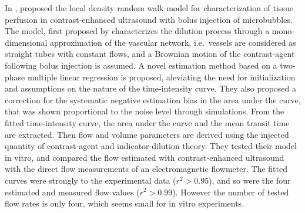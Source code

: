 In \citeyear{Mischi:2003ed}, \citet{Mischi:2003ed} proposed the local density random walk model for characterization of tissue perfusion in contrast-enhanced ultrasound with bolus injection of microbubbles. 
The model, first proposed by \citet{Sheppard:1951we} characterizes the dilution process through a mono-dimensional approximation of the vascular network, i.e.~vessels are considered as straight tubes with constant flows, and a Brownian motion of the contrast-agent following bolus injection is assumed.
A novel estimation method based on a two-phase multiple linear regression is proposed, aleviating the need for initialization and assumptions on the nature of the time-intensity curve.
They also proposed a correction for the systematic negative estimation bias in the area under the curve, that was shown proportional to the noise level through simulations.
From the fitted time-intensity curve, the area under the curve and the mean transit time are extracted.
Then flow and volume parameters are derived using the injected quantity of contrast-agent and indicator-dilution theory.
They tested their model in vitro, and compared the flow estimated with contrast-enhanced ultrasound with the direct flow measurements of an electromagnetic flowmeter.
The fitted curves were strongly to the experimental data ($r^2 \gt 0.95$), and so were the four estimated and measured flow values ($r^2 \gt 0.99$).
However the number of tested flow rates is only four, which seems small for in vitro experiments.

